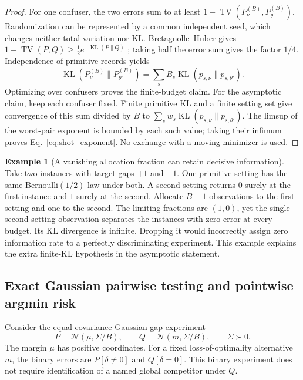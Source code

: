 \documentclass[a4paper,onecolumn,unpublished,nopdfoutputerror]{quantumarticle}
\theoremstyle{plain}
\theoremstyle{definition}
\newtheorem{example}[theorem]{Example}
\newcommand{\1}{\mathbf{1}}
\newcommand{\KL}{\operatorname{KL}}
\newcommand{\TV}{\operatorname{TV}}
\begin{document}
\begin{proof}
For one confuser, the two errors sum to at least $1-\TV(P_\nu^{(B)},P_{\theta'}^{(B)})$. Randomization can be represented by a common independent seed, which changes neither total variation nor KL. Bretagnolle--Huber gives $1-\TV(P,Q)\ge\tfrac12e^{-\KL(P\|Q)}$ \cite{BretagnolleHuber1979,Tsybakov2009}; taking half the error sum gives the factor $1/4$. Independence of primitive records yields
\[
\KL(P_\nu^{(B)}\|P_{\theta'}^{(B)})
=\sum_s B_s\KL(p_{s,\nu}\|p_{s,\theta'}).
\]
Optimizing over confusers proves the finite-budget claim. For the asymptotic claim, keep each confuser fixed. Finite primitive KL and a finite setting set give convergence of this sum divided by $B$ to $\sum_s w_s\KL(p_{s,\nu}\|p_{s,\theta'})$. The limsup of the worst-pair exponent is bounded by each such value; taking their infimum proves Eq.~\eqref{eq:shot_exponent}. No exchange with a moving minimizer is used.
\end{proof}

\begin{example}[A vanishing allocation fraction can retain decisive information]
Take two instances with target gaps $+1$ and $-1$. One primitive setting has the
same Bernoulli$(1/2)$ law under both. A second setting returns $0$ surely at the
first instance and $1$ surely at the second. Allocate $B-1$ observations to the
first setting and one to the second. The limiting fractions are $(1,0)$, yet
the single second-setting observation separates the instances with zero error
at every budget. Its KL divergence is infinite. Dropping it would incorrectly
assign zero information rate to a perfectly discriminating experiment. This
example explains the extra finite-KL hypothesis in the asymptotic statement.
\end{example}

\subsection{Exact Gaussian pairwise testing and pointwise argmin risk}
Consider the equal-covariance Gaussian gap experiment
\begin{equation}\label{eq:fixed_budget_gap_obs}
P=\mathcal N(\mu,\Sigma/B),\qquad Q=\mathcal N(m,\Sigma/B),\qquad \Sigma\succ0.
\end{equation}
The margin $\mu$ has positive coordinates. For a fixed loss-of-optimality alternative $m$, the binary errors are $P[\delta\ne0]$ and $Q[\delta=0]$. This binary experiment does not require identification of a named global competitor under $Q$.
\end{document}
